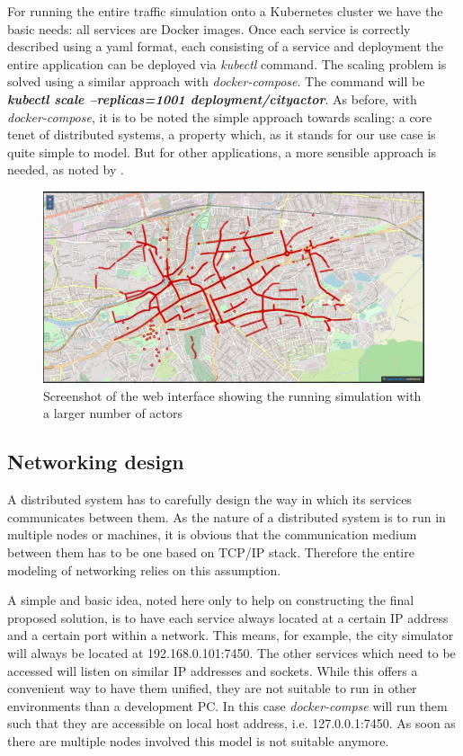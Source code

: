 \documentclass[conference]{IEEEtran}
\begin{document}
For running the entire traffic simulation onto a Kubernetes cluster we have the basic needs: all services are Docker images. Once each service is correctly described using a yaml format, each consisting of a service and deployment the entire application can be deployed via \textit{kubectl} command. The scaling problem is solved using a similar approach with \textit{docker-compose}. The command will be \textit{\textbf{kubectl scale --replicas=1001 deployment/cityactor}}. As before, with \textit{docker-compose}, it is to be noted the simple approach towards scaling: a core tenet of distributed systems, a property which, as it stands for our use case is quite simple to model. But for other applications, a more sensible approach is needed, as noted by \cite{jogalekar2000evaluating}.

\begin{figure}
  \includegraphics[width=0.9\linewidth]{ScreenshotWebInterface2.jpg}
  \centering
  \caption{Screenshot of the web interface showing the running simulation with a larger number of actors}
  \label{fig:ScreenshotWebInterface2}
\end{figure}

\subsection{Networking design}
\label{subsec:networking}

A distributed system has to carefully design the way in which its services communicates between them. As the nature of a distributed system is to run in multiple nodes or machines, it is obvious that the communication medium between them has to be one based on TCP/IP stack. Therefore the entire modeling of networking relies on this assumption.

A simple and basic idea, noted here only to help on constructing the final proposed solution, is to have each service always located at a certain IP address and a certain port within a network. This means, for example, the city simulator will always be located at 192.168.0.101:7450. The other services which need to be accessed will listen on similar IP addresses and sockets. While this offers a convenient way to have them unified, they are not suitable to run in other environments than a development PC. In this case \textit{docker-compse} will run them such that they are accessible on local host address, i.e. 127.0.0.1:7450. As soon as there are multiple nodes involved this model is not suitable anymore.
\end{document}
